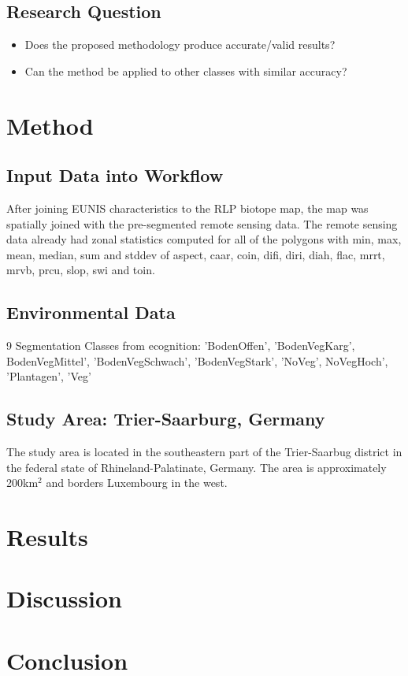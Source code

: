 \documentclass[a4paper,12pt]{article}
\begin{document}
\subsection{Research Question}
\begin{itemize}
  \item Does the proposed methodology produce accurate/valid results?
  \item Can the method be applied to other classes with similar accuracy?
\end{itemize}

\section{Method}
\subsection{Input Data into Workflow}
After joining EUNIS characteristics to the RLP biotope map, the map was 
spatially joined with the pre-segmented remote sensing data. The remote sensing
data already had zonal statistics computed for all of the polygons with min,
max, mean, median, sum and stddev of aspect, caar, coin, difi, diri, diah, flac,
mrrt, mrvb, prcu, slop, swi and toin.

\subsection{Environmental Data}

9 Segmentation Classes from ecognition:
'BodenOffen', 'BodenVegKarg', BodenVegMittel', 'BodenVegSchwach',
'BodenVegStark', 'NoVeg', NoVegHoch', 'Plantagen', 'Veg'


\subsection{Study Area: Trier-Saarburg, Germany}
The study area is located in the southeastern part of the Trier-Saarbug district
in the federal state of Rhineland-Palatinate, Germany. The area is 
approximately 200km$^{2}$ and borders Luxembourg in the west. 

\section{Results}

\section{Discussion}

\section{Conclusion}
\end{document}
